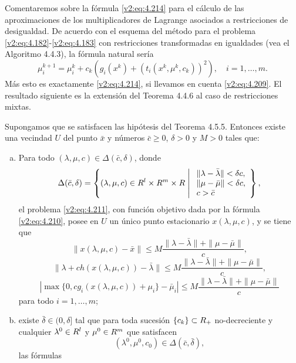 Comentaremos sobre la fórmula \eqref{v2:eq:4.214} para el cálculo de las aproximaciones de los multiplicadores de Lagrange asociados a restricciones de desigualdad. De acuerdo con el esquema del método para el problema \eqref{v2:eq:4.182}-\eqref{v2:eq:4.183} con restricciones transformadas en igualdades (vea el Algoritmo 4.4.3), la fórmula natural sería
\[
    \mu_i^{k+1} = \mu_i^k + c_k(g_i(x^k) + (t_i(x^k, \mu^k, c_k))^2), \quad i = 1, \dots, m.
\]
Más esto es exactamente \eqref{v2:eq:4.214}, si llevamos en cuenta \eqref{v2:eq:4.209}.
El resultado siguiente es la extensión del Teorema 4.4.6 al caso de restricciones mixtas.

\begin{theorem}\label{v2:thm:4.5.7}
    Supongamos que se satisfacen las hipótesis del Teorema 4.5.5.
    Entonces existe una vecindad $U$ del punto $\bar{x}$ y números $\bar{c} \ge 0$, $\delta > 0$ y $M > 0$ tales que:
    \begin{enumerate}[(a)]
        \item Para todo $(\lambda, \mu, c) \in \Delta(\bar{c}, \delta)$, donde
        \[
            \Delta(\bar{c}, \delta) = \left\{ (\lambda, \mu, c) \in R^l \times R^m \times R \;\middle|\; \begin{array}{l} \|\lambda - \bar{\lambda}\| < \delta c, \\ \|\mu - \bar{\mu}\| < \delta c, \\ c > \bar{c} \end{array} \right\},
        \]
        el problema \eqref{v2:eq:4.211}, con función objetivo dada por la fórmula \eqref{v2:eq:4.210}, posee en $U$ un único punto estacionario $x(\lambda, \mu, c)$, y se tiene que
        \[
            \|x(\lambda, \mu, c) - \bar{x}\| \le M\frac{\|\lambda - \bar{\lambda}\| + \|\mu - \bar{\mu}\|}{c},
        \]
        \[
            \|\lambda + c h(x(\lambda, \mu, c)) - \bar{\lambda}\| \le M\frac{\|\lambda - \bar{\lambda}\| + \|\mu - \bar{\mu}\|}{c},
        \]
        \[
            |\max\{0, c g_i(x(\lambda, \mu, c)) + \mu_i\} - \bar{\mu}_i| \le M\frac{\|\lambda - \bar{\lambda}\| + \|\mu - \bar{\mu}\|}{c}
        \]
        para todo $i = 1, \dots, m$;
        \item existe $\bar{\delta} \in (0, \delta]$ tal que para toda sucesión $\{c_k\} \subset R_+$ no-decreciente y cualquier $\lambda^0 \in R^l$ y $\mu^0 \in R^m$ que satisfacen
        \[
            (\lambda^0, \mu^0, c_0) \in \Delta(\bar{c}, \bar{\delta}),
        \]
        las fórmulas
        \[
\]
\end{enumerate}
\end{theorem}
